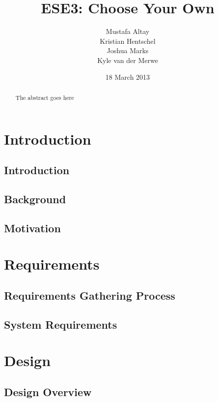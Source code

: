 \documentclass{l3proj}
\begin{document}
\title{ESE3: Choose Your Own}
\author{Mustafa Altay\\
        Kristian Hentschel \\
        Joshua Marks \\
        Kyle van der Merwe}
\date{18 March 2013}
\maketitle
\begin{abstract}

The abstract goes here

\end{abstract}
\educationalconsent
\tableofcontents
\chapter{Introduction}
\label{intro}
\section{Introduction}

\section{Background}

\section{Motivation}

\chapter{Requirements}
\label{requirements}

\section{Requirements Gathering Process}
\label{gathering}

\section{System Requirements}
\label{system}

\chapter{Design}
\label{design}
\section{Design Overview}


\end{document}
